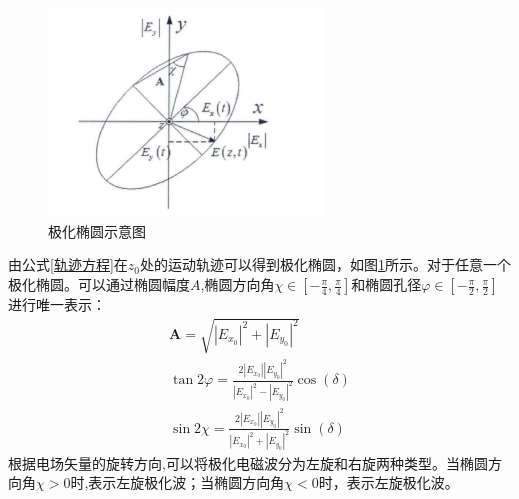 \begin{figure}[h]
    \includegraphics[width=7.3cm]{pic/chapter2/极化椭圆.jpg}
    \caption{极化椭圆示意图}
    \label{极化椭圆示意图}
\end{figure}

由公式\ref{轨迹方程}在$z_0$处的运动轨迹可以得到极化椭圆，如图\ref{极化椭圆示意图}所示。对于任意一个极化椭圆。可以通过椭圆幅度$A$,椭圆方向角$\chi \in [-\frac{\pi}{4}, \frac{\pi}{4}]$和椭圆孔径$\varphi \in [-\frac{\pi}{2}, \frac{\pi}{2}]$进行唯一表示：
\begin{gather}
    \mathbf{A}=\sqrt{\left|E_{x_0}\right|^2+\left|E_{y_0}\right|^2}                                                                \\
    \tan 2 \varphi=\frac{2\left|E_{x_0}\right|\left|E_{y_0}\right|^2}{\left|E_{x_0}\right|^2-\left|E_{y_0}\right|^2} \cos (\delta) \\
    \sin 2 \chi=\frac{2\left|E_{x_0}\right|\left|E_{y_0}\right|^2}{\left|E_{x_0}\right|^2+\left|E_{y_0}\right|^2} \sin (\delta)
\end{gather}
根据电场矢量的旋转方向,可以将极化电磁波分为左旋和右旋两种类型。当椭圆方向角$\chi > 0$时,表示左旋极化波；当椭圆方向角$\chi < 0$时，表示左旋极化波。
